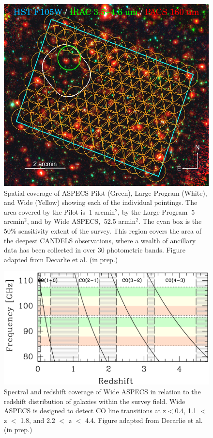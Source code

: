 \begin{figure}[tbp]
\centering \includegraphics[width=120mm]{Wide_ASPECS_Coverage.png}
\caption{Spatial coverage of ASPECS Pilot (Green), Large Program (White), and Wide (Yellow) showing each of the individual pointings. The area covered by the Pilot is $~$1 arcmin$^2$, by the Large Program $~$5 arcmin$^2$, and by Wide ASPECS, $~$52.5 armin$^2$. The cyan box is the 50\% sensitivity extent of the survey. This region covers the area of the deepest CANDELS observations, where a wealth of ancillary data has been collected in over 30 photometric bands. Figure adapted from Decarlie et al. (in prep.)} %
\label{fig:ASPECS_Coverage}
\end{figure}

\begin{figure}[tbp]
\centering
\includegraphics[width=120mm]{Wide_ASPECS_Freq.png}
\caption{Spectral and redshift coverage of Wide ASPECS in relation to the redshift distribution of galaxies within the survey field. Wide ASPECS is designed to detect CO line transitions at z$<$0.4, 1.1 $<$ z $<$ 1.8, and 2.2 $<$ z $<$ 4.4. Figure adapted from Decarlie et al. (in prep.)}
\label{fig:ASPECS_Freq}
\end{figure}


